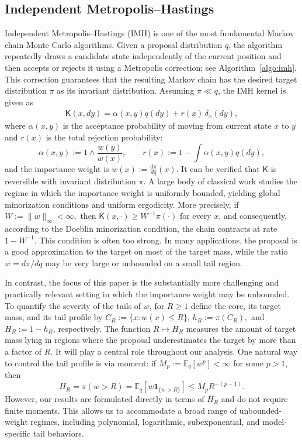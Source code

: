 \documentclass[10pt, journal]{IEEEtran}
\newcommand{\sK}{\mathsf{K}}
\begin{document}
\subsection{Independent Metropolis--Hastings} \label{sec:MH} Independent Metropolis--Hastings (IMH) is one of the most fundamental Markov chain Monte Carlo algorithms. Given a proposal distribution $q$, the algorithm repeatedly draws a candidate state independently of the current position and then accepts or rejects it using a Metropolis correction; see Algorithm~\ref{algo:imh}. This correction guarantees that the resulting Markov chain has the desired target distribution $\pi$ as its invariant distribution. Assuming $\pi\ll q$, the IMH kernel is given as 
\begin{align*}
    \sK(x, dy) = \alpha(x, y) q(dy) + r(x) \, \delta_x(dy),
\end{align*}
where $\alpha(x, y)$ is the acceptance probability of moving from current state $x$ to $y$ and $r(x)$ is the total rejection probability:
$$\alpha(x,y):=1\wedge\frac{w(y)}{w(x)},\qquad r(x):=1-\int\alpha(x,y)q(dy),$$
and the importance weight is $w(x):=\frac{d\pi}{dq}(x).$ It can be verified that $\sK$ is reversible with invariant distribution $\pi$. A large body of classical work studies the regime in which the importance weight is uniformly bounded, yielding global minorization conditions and uniform ergodicity. More precisely, if $W:=\|w\|_\infty<\infty,$ then $\sK(x,\cdot)\ge W^{-1}\pi(\cdot)$ for every $x$, and consequently, according to the Doeblin minorization condition,   the chain contracts at rate $1-W^{-1}$. This condition is often too strong. In many applications, the proposal is a good approximation to the target on most of the target mass, while the ratio $w=d\pi/dq$ may be very large or unbounded on a small tail region.

In contrast, the focus of this paper is the substantially more challenging and practically relevant setting in which the importance weight may be unbounded. To quantify the severity of the tails of $w$, for $R\ge1$ define the core, its target mass, and its tail profile by $C_R:=\{x:w(x)\le R\}$, $h_R:=\pi(C_R),$ and  $H_R:=1-h_R$, respectively. The function $R\mapsto H_R$ measures the amount of target mass lying in regions where the proposal underestimates the target by more than a factor of $R$. It will play a central role throughout our analysis. One natural way to control the tail profile is via moment: if $M_p:=\mathbb E_q[w^p]<\infty$ for some $p>1$, then $$H_R=\pi(w>R)=\mathbb E_q[w\mathbf 1_{\{w>R\}}]\le M_pR^{-(p-1)}.$$ However, our results are formulated directly in terms of $H_R$ and do not require finite moments. This allows us to accommodate a broad range of unbounded-weight regimes, including polynomial, logarithmic, subexponential, and model-specific tail behaviors.
\end{document}
